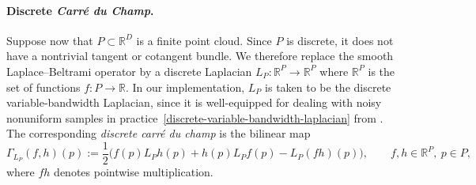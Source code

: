 \documentclass{article}
\newcommand{\R}{\mathbb{R}}
\newcommand{\cdc}{\textit{carré du champ}}
\newcommand{\CdC}{\textit{Carré du Champ}}
\newtheorem{proposition}[theorem]{Proposition}
\theoremstyle{remark}
\theoremstyle{plain}
\begin{document}

\paragraph{Discrete \CdC.}
Suppose now that $P \subset \mathbb{R}^D$ is a finite point cloud. Since $P$
is discrete, it does not have a nontrivial tangent or cotangent bundle. We
therefore replace the smooth Laplace--Beltrami operator by a discrete
Laplacian $L_P : \mathbb{R}^P \to \mathbb{R}^P$ where $\mathbb{R}^P$ is the set of functions $f: P \to \R$. In our implementation, $L_P$ is taken to be the discrete variable-bandwidth Laplacian, since it is well-equipped for dealing with noisy nonuniform samples in practice~\ref{discrete-variable-bandwidth-laplacian} from \cite{Berry2016}. The corresponding \textit{discrete \cdc} is the bilinear map
\begin{equation}
\Gamma_{L_P}(f,h)(p)
:=
\frac{1}{2}
\Big(
f(p)L_P h(p)
+
h(p)L_P f(p)
-
L_P(fh)(p)
\Big),
\qquad
f,h \in \mathbb{R}^P,\ p\in P,
\end{equation}
where $fh$ denotes pointwise multiplication.
\end{document}
